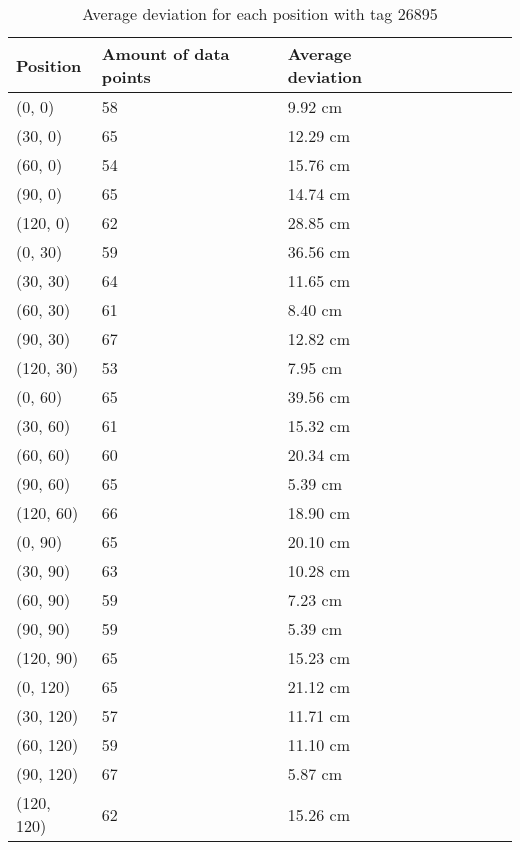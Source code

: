\begin{table}[H] 
    \centering
    \begin{tabular}{|l|l|l|l|l|l|l|l|}
    \hline
    Position   & Amount of data points  & Average deviation \\ \hline
    (0, 0)     & 58                     & 9.92 cm             \\ \hline 
    (30, 0)    & 65                     & 12.29 cm            \\ \hline
    (60, 0)    & 54                     & 15.76 cm            \\ \hline
    (90, 0)    & 65                     & 14.74 cm            \\ \hline
    (120, 0)   & 62                     & 28.85 cm            \\ \hline
    (0, 30)    & 59                     & 36.56 cm            \\ \hline
    (30, 30)   & 64                     & 11.65 cm             \\ \hline
    (60, 30)   & 61                     & 8.40 cm             \\ \hline
    (90, 30)   & 67                     & 12.82 cm            \\ \hline
    (120, 30)  & 53                     & 7.95 cm             \\ \hline
    (0, 60)    & 65                     & 39.56 cm            \\ \hline
    (30, 60)   & 61                     & 15.32 cm             \\ \hline
    (60, 60)   & 60                     & 20.34 cm            \\ \hline
    (90, 60)   & 65                     & 5.39 cm             \\ \hline
    (120, 60)  & 66                     & 18.90 cm            \\ \hline
    (0, 90)    & 65                     & 20.10 cm            \\ \hline
    (30, 90)   & 63                     & 10.28 cm              \\ \hline
    (60, 90)   & 59                     & 7.23 cm             \\ \hline
    (90, 90)   & 59                     & 5.39 cm             \\ \hline
    (120, 90)  & 65                     & 15.23 cm             \\ \hline
    (0, 120)   & 65                     & 21.12 cm            \\ \hline
    (30, 120)  & 57                     & 11.71 cm             \\ \hline
    (60, 120)  & 59                     & 11.10 cm             \\ \hline
    (90, 120)  & 67                     & 5.87 cm             \\ \hline
    (120, 120) & 62                     & 15.26 cm            \\ \hline
    \end{tabular}
    \label{average-deviation-1-tag}
    \caption{Average deviation for each position with tag 26895}
\end{table}

